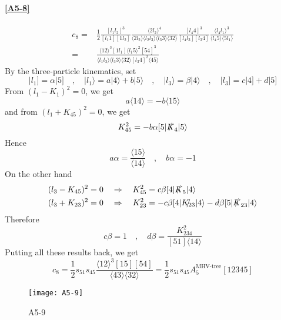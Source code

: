 \paragraph{\ref{A5-8}}
\begin{equation*}
\begin{split}
c_8 = & \frac{1}{2}
\frac{[l_1 l_2]^3}{[l_1 1][1l_2]}
\frac{\langle 2 l_2 \rangle^4}{\langle 2l_2 \rangle\langle l_2 l_3\rangle\langle l_3 3 \rangle\langle 32 \rangle}
\frac{[l_4 4 ]^3}{[l_4 l_3][l_3 4]}
\frac{\langle l_4 l_1 \rangle^3}{\langle l_4 5 \rangle\langle 5 l_1\rangle}
\\
= &
\frac{\langle 12 \rangle^3[1l_1 ]\langle l_1 5\rangle^2 [54]^3}{\langle l_1 l_3\rangle\langle l_3 3 \rangle\langle 32 \rangle [l_3 4 ]^2\langle 45\rangle}
\end{split}
\end{equation*}
By the three-particle kinematics, set
\begin{equation*}
|l_1] = \alpha |5]
\quad,\quad
|l_1\rangle = a|4\rangle + b|5\rangle
\quad,\quad
|l_3\rangle = \beta |4\rangle
\quad,\quad
|l_3] = c|4] + d|5]
\end{equation*}
From $(l_1 - K_1)^2 = 0$, we get
\begin{equation*}
a\langle 14\rangle = -b\langle 15 \rangle
\end{equation*}
and from $(l_1 + K_{45})^2 = 0$, we get
\begin{equation*}
K_{45}^2 = -b\alpha [5|\slashed{K}_4|5\rangle 
\end{equation*}
Hence
\begin{equation*}
a\alpha = \frac{\langle 15\rangle}{\langle 14\rangle}\quad,\quad
b\alpha = -1
\end{equation*}
On the other hand
\begin{equation*}
\begin{split}
& (l_3 - K_{45})^2 = 0 \quad\Rightarrow\quad
K_{45}^2 = c\beta [4|\slashed{K}_5|4\rangle
\\
& (l_3 + K_{23})^2 = 0 \quad\Rightarrow\quad
K_{23}^2 = -c\beta [4|\slashed{K_{23}}|4\rangle - d\beta [5|\slashed{K}_{23}|4\rangle
\end{split}
\end{equation*}
Therefore
\begin{equation*}
c\beta = 1 \quad,\quad 
d\beta = \frac{K_{234}^2}{[51]\langle 14 \rangle}
\end{equation*}
Putting all these results back, we get
\begin{equation*}
c_8 = \frac{1}{2} s_{51}s_{45} \frac{\langle 12 \rangle^3 [15] [54]}{\langle 43 \rangle\langle 32 \rangle}=\frac{1}{2} s_{51}s_{45} A_5^{\textrm{MHV-tree}}[12345]
\end{equation*}
%
%
\iffalse %
%
\begin{figure}
  \centering
    \texttt{[image: A5-9]}
    \caption{A5-9}
  \label{A5-9}
\end{figure}
